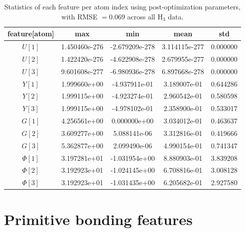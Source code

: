 \documentclass[12pt]{article}
\begin{document}
\begin{table}[!htbp]
\centering
\caption{Statistics of each feature per atom index using post-optimization parameters, with RMSE $= 0.069$ across all H$_3$ data.}
\label{tb:featstat_copt}
\begin{tabular}{ccccc}
\toprule
feature[atom] &   max & min & mean &  std \\
\midrule
$U[1]$    &  1.450460e-276 & -2.679209e-278 &  3.114115e-277 &  0.000000 \\
$U[2]$    &  1.422420e-276 & -4.622908e-278 &  2.679955e-277 &  0.000000 \\
$U[3]$    &  9.601608e-277 & -6.980936e-278 &  6.897668e-278 &  0.000000 \\
$Y[1]$    &   1.999660e+00 &  -4.937911e-01 &   3.189007e-01 &  0.644286 \\
$Y[2]$    &   1.999115e+00 &  -4.923274e-01 &   2.960542e-01 &  0.580598 \\
$Y[3]$    &   1.999115e+00 &  -4.978102e-01 &   2.358900e-01 &  0.533017 \\
$G[1]$    &   4.256561e+00 &   0.000000e+00 &   3.034012e-01 &  0.463637 \\
$G[2]$    &   3.609277e+00 &   5.088141e-06 &   3.312816e-01 &  0.419666 \\
$G[3]$    &   5.362877e+00 &   2.099490e-06 &   4.990154e-01 &  0.741347 \\
$\Phi[1]$ &   3.197281e+01 &  -1.031954e+00 &   8.880903e-01 &  3.839208 \\
$\Phi[2]$ &   3.192923e+01 &  -1.024145e+00 &   6.708816e-01 &  3.008128 \\
$\Phi[3]$ &   3.192923e+01 &  -1.031435e+00 &   6.205682e-01 &  2.927580 \\
\bottomrule
\end{tabular}
\end{table}

\section{Primitive bonding features}
\end{document}

